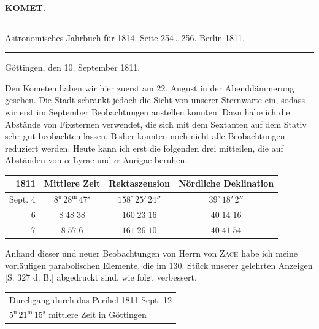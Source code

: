 \clearpage{}\hypertarget{native-338-lower}{}\label{native-338-lower}
\begin{center}\textbf{KOMET.}\par\vspace{4pt}\hrule\vspace{4pt}\fontsize{10}{12}\selectfont Astronomisches Jahrbuch für 1814. Seite 254\,..\,256. Berlin 1811.\par\vspace{4pt}\hrule\vspace{4pt}\end{center}


\begin{flushright}Göttingen, den 10. September 1811.\end{flushright}
\par\indent Den Kometen haben wir hier zuerst am 22. August in der Abenddämmerung gesehen. Die Stadt schränkt jedoch die Sicht von unserer Sternwarte ein, sodass wir erst im September Beobachtungen anstellen konnten. Dazu habe ich die Abstände von Fixsternen verwendet, die sich mit dem Sextanten auf dem Stativ sehr gut beobachten lassen. Bisher konnten noch nicht alle Beobachtungen reduziert werden. Heute kann ich erst die folgenden drei mitteilen, die auf Abständen von $\alpha$ Lyrae und $\alpha$ Aurigae beruhen.
\begin{center}\fontsize{10}{12}\selectfont\setlength{\tabcolsep}{4pt}\renewcommand{\arraystretch}{1.15}\begin{tabular}{r|c|c|c}
1811 & Mittlere Zeit & Rektaszension & Nördliche Deklination\\
\hline
Sept. 4 & $8^{\mathrm u}\,28^{\mathrm m}\,47^{\mathrm s}$ & $158^\circ\,25'\,24''$ & $39^\circ\,18'\,2''$\\
6 & $8\;48\;38$ & $160\;23\;16$ & $40\;14\;16$\\
7 & $8\;57\;6$ & $161\;26\;10$ & $40\;41\;54$\\
\end{tabular}\end{center}

\par\indent Anhand dieser und neuer Beobachtungen von Herrn von \textsc{Zach} habe ich meine vorläufigen parabolischen Elemente, die im 130. Stück unserer gelehrten Anzeigen [S. 327 d. B.] abgedruckt sind, wie folgt verbessert.
\begin{center}\fontsize{10}{12}\selectfont\setlength{\tabcolsep}{4pt}\renewcommand{\arraystretch}{1.15}\begin{tabular}{l}
Durchgang durch das Perihel 1811 Sept. 12\\
\quad $5^{\mathrm u}\,21^{\mathrm m}\,15^{\mathrm s}$ mittlere Zeit in Göttingen\\
\end{tabular}\end{center}

